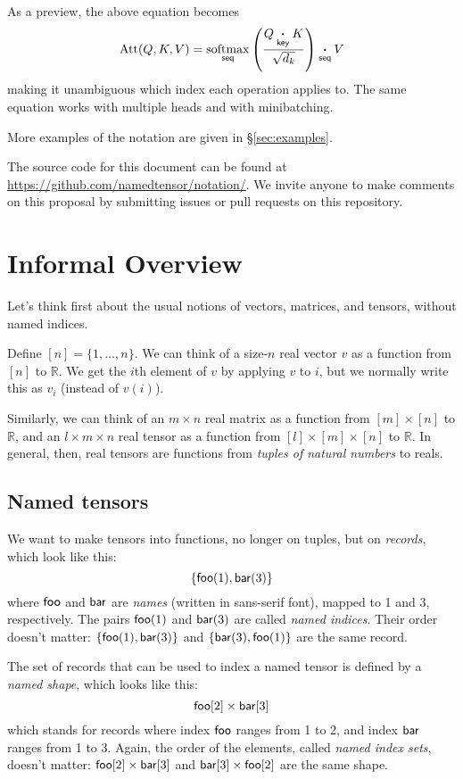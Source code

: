 \documentclass{article}
\newcommand{\tuple}[1]{\{#1\}}
\begin{document}
As a preview, the above equation becomes
\begin{equation*}
  \text{Att}(Q,K,V) = \nfun{seq}{softmax} \left( \frac{Q \ndot{key} K}{\sqrt{d_k}} \right) \ndot{seq} V
\end{equation*}
making it unambiguous which index each operation applies to. The same equation works with multiple heads and with minibatching.

More examples of the notation are given in \S\ref{sec:examples}.

The source code for this document can be found at \url{https://github.com/namedtensor/notation/}. We invite anyone to make comments on this proposal by submitting issues or pull requests on this repository.

\section{Informal Overview}
\label{sec:intro}

Let's think first about the usual notions of vectors, matrices, and tensors, without named indices.

Define $[n] = \{1, \ldots, n\}$. We can think of a size-$n$ real vector $v$ as a function from $[n]$ to $\mathbb{R}$. We get the $i$th element of $v$ by applying $v$ to $i$, but we normally write this as $v_i$ (instead of $v(i)$). 

Similarly, we can think of an $m \times n$ real matrix as a function from $[m] \times [n]$ to $\mathbb{R}$, and an $l \times m \times n$ real tensor as a function from $[l] \times [m] \times [n]$ to $\mathbb{R}$. In general, then, real tensors are functions from \emph{tuples of natural numbers} to reals.

\subsection{Named tensors}

We want to make tensors into functions, no longer on tuples, but on \emph{records}, which look like this: \[\tuple{\nidx{foo}{1}, \nidx{bar}{3}}\] where $\name{foo}$ and $\name{bar}$ are \emph{names} (written in sans-serif font), mapped to 1 and 3, respectively. The pairs $\nidx{foo}{1}$ and $\nidx{bar}{3}$ are called \emph{named indices}. Their order doesn't matter: $\tuple{\nidx{foo}{1}, \nidx{bar}{3}}$ and $\tuple{\nidx{bar}{3}, \nidx{foo}{1}}$ are the same record.

The set of records that can be used to index a named tensor is defined by a \emph{named shape}, which looks like this: \[\nset{foo}{2} \times \nset{bar}{3}\] which stands for records where index $\name{foo}$ ranges from 1 to 2, and index $\name{bar}$ ranges from 1 to 3. Again, the order of the elements, called \emph{named index sets}, doesn't matter: $\nset{foo}{2} \times \nset{bar}{3}$ and $\nset{bar}{3} \times \nset{foo}{2}$ are the same shape.
\end{document}
